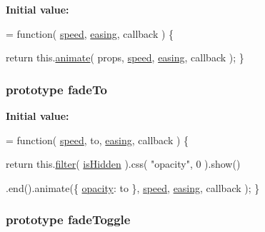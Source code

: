 {\bfseries Initial value\-:}
\begin{DoxyCode}
= \textcolor{keyword}{function}( \hyperlink{jquery-1_810_82-vsdoc_8js_add98c90065e6563cba26ff6d2016c46c}{speed}, \hyperlink{jquery-1_810_82-vsdoc_8js_a9758a312629fa6de1744280dd6e6253b}{easing}, callback ) \{


        \textcolor{keywordflow}{return} this.\hyperlink{jquery-1_810_82-vsdoc_8js_a956a1d08128d41115c45b6815814a64d}{animate}( props, \hyperlink{jquery-1_810_82-vsdoc_8js_add98c90065e6563cba26ff6d2016c46c}{speed}, \hyperlink{jquery-1_810_82-vsdoc_8js_a9758a312629fa6de1744280dd6e6253b}{easing}, callback );
    \}
\end{DoxyCode}
\hypertarget{jquery-1_810_82-vsdoc_8js_a3e1ca57624879f2353f88a9b747aa8dc}{
\subsubsection[{fade\-To}]{ {\bf prototype} fade\-To}}\label{jquery-1_810_82-vsdoc_8js_a3e1ca57624879f2353f88a9b747aa8dc}
{\bfseries Initial value\-:}
\begin{DoxyCode}
= \textcolor{keyword}{function}( \hyperlink{jquery-1_810_82-vsdoc_8js_add98c90065e6563cba26ff6d2016c46c}{speed}, to, \hyperlink{jquery-1_810_82-vsdoc_8js_a9758a312629fa6de1744280dd6e6253b}{easing}, callback ) \{



        
        \textcolor{keywordflow}{return} this.\hyperlink{jquery-1_810_82-vsdoc_8js_ac99d0cf56cab46114f5765a14e03ad6d}{filter}( \hyperlink{jquery-1_810_82_8js_a67ed58d688ff11991ca2826ebfbf28a4}{isHidden} ).css( \textcolor{stringliteral}{"opacity"}, 0 ).show()

            
            .end().animate(\{ \hyperlink{jquery-1_810_82_8min_8js_a328c19d9255bfd09a2f3cddecadca6ad}{opacity}: to \}, \hyperlink{jquery-1_810_82-vsdoc_8js_add98c90065e6563cba26ff6d2016c46c}{speed}, \hyperlink{jquery-1_810_82-vsdoc_8js_a9758a312629fa6de1744280dd6e6253b}{easing}, callback );
    \}
\end{DoxyCode}
\hypertarget{jquery-1_810_82-vsdoc_8js_ada46ab8667c3108cbdaf50446d41cc59}{
\subsubsection[{fade\-Toggle}]{ {\bf prototype} fade\-Toggle}}\label{jquery-1_810_82-vsdoc_8js_ada46ab8667c3108cbdaf50446d41cc59}
